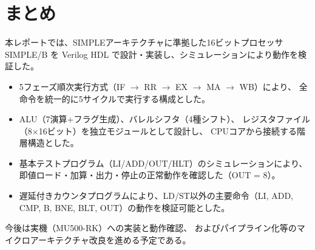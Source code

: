 \documentclass[a4paper,11pt]{ltjsarticle}
\begin{document}
\section{まとめ}

本レポートでは、SIMPLEアーキテクチャに準拠した16ビットプロセッサ SIMPLE/B を
Verilog HDL で設計・実装し、シミュレーションにより動作を検証した。

\begin{itemize}
\item 5フェーズ順次実行方式（IF $\rightarrow$ RR $\rightarrow$ EX $\rightarrow$ MA $\rightarrow$ WB）により、
  全命令を統一的に5サイクルで実行する構成とした。
\item ALU（7演算+フラグ生成）、バレルシフタ（4種シフト）、
  レジスタファイル（8$\times$16ビット）を独立モジュールとして設計し、
  CPUコアから接続する階層構造とした。
\item 基本テストプログラム（LI/ADD/OUT/HLT）のシミュレーションにより、
  即値ロード・加算・出力・停止の正常動作を確認した（OUT = 8）。
\item 遅延付きカウンタプログラムにより、LD/ST以外の主要命令（LI, ADD, CMP,
  B, BNE, BLT, OUT）の動作を検証可能とした。
\end{itemize}

今後は実機（MU500-RK）への実装と動作確認、
およびパイプライン化等のマイクロアーキテクチャ改良を進める予定である。
\end{document}
